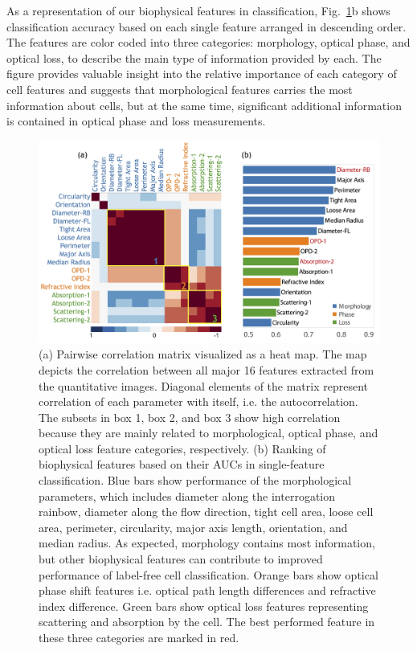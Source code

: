 \documentclass[aps,pra,reprint,longbibliography,superscriptaddress]{revtex4-1}
\begin{document}
As a representation of our biophysical features in classification, Fig.~\ref{fig:FeaturesCorrRank}b shows classification accuracy based on each single feature arranged in descending order. The features are color coded into three categories: morphology, optical phase, and optical loss, to describe the main type of information provided by each. The figure provides valuable insight into the relative importance of each category of cell features and suggests that morphological features carries the most information about cells, but at the same time, significant additional information is contained in optical phase and loss measurements. 

\begin{figure}
\includegraphics[scale=0.17]{FigureFeaturesCorrelationRank.jpg}
\caption{\label{fig:FeaturesCorrRank} (a) Pairwise correlation matrix visualized as a heat map. The map depicts the correlation between all major 16 features extracted from the quantitative images. Diagonal elements of the matrix represent correlation of each parameter with itself, i.e. the autocorrelation. The subsets in box 1, box 2, and box 3 show high correlation because they are mainly related to morphological, optical phase, and optical loss feature categories, respectively. (b) Ranking of biophysical features based on their AUCs in single-feature classification. Blue bars show performance of the morphological parameters, which includes diameter along the interrogation rainbow, diameter along the flow direction, tight cell area, loose cell area, perimeter, circularity, major axis length, orientation, and median radius. As expected, morphology contains most information, but other biophysical features can contribute to improved performance of label-free cell classification. Orange bars show optical phase shift features i.e. optical path length differences and refractive index difference. Green bars show optical loss features representing scattering and absorption by the cell. The best performed feature in these three categories are marked in red.}
\end{figure}
\end{document}
